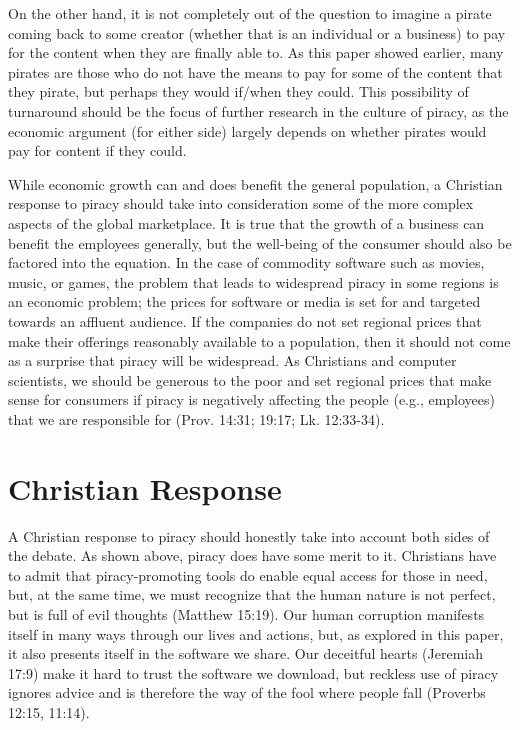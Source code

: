 \documentclass[onecolumn, 12pt]{article}
\begin{document}
\begin{refsection}
On the other hand, it is not completely out of the question to imagine a
pirate coming back to some creator (whether that is an individual or a
business) to pay for the content when they are finally able to. As this paper
showed earlier, many pirates are those who do not have the means to pay for
some of the content that they pirate, but perhaps they would if/when they
could. This possibility of turnaround should be the focus of further research
in the culture of piracy, as the economic argument (for either side) largely
depends on whether pirates would pay for content if they could.

While economic growth can and does benefit the general population, a Christian
response to piracy should take into consideration some of the more complex
aspects of the global marketplace. It is true that the growth of a business can
benefit the employees generally, but the well-being of the consumer should also
be factored into the equation. In the case of commodity software such as
movies, music, or games, the problem that leads to widespread piracy in some
regions is an economic problem; the prices for software or media is set for and
targeted towards an affluent audience. If the companies do not set regional
prices that make their offerings reasonably available to a population, then it
should not come as a surprise that piracy will be widespread. As Christians and
computer scientists, we should be generous to the poor and set regional prices
that make sense for consumers if piracy is negatively affecting the people
(e.g., employees) that we are responsible for (Prov. 14:31; 19:17; Lk. 12:33-34).

\section{Christian Response}
A Christian response to piracy should honestly take into account both sides of
the debate. As shown above, piracy does have some merit to it. Christians have
to admit that piracy-promoting tools do enable equal access for those in need,
but, at the same time, we must recognize that the human nature is not perfect,
but is full of evil thoughts (Matthew 15:19). Our human corruption manifests
itself in many ways through our lives and actions, but, as explored in this
paper, it also presents itself in the software we share. Our deceitful hearts
(Jeremiah 17:9) make it hard to trust the software we download, but reckless
use of piracy ignores advice and is therefore the way of the fool where people
fall (Proverbs 12:15, 11:14).


\end{refsection}
\end{document}
